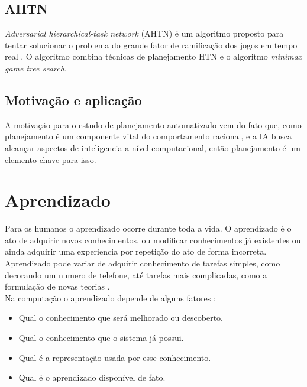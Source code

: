 
\subsection{AHTN} 

\textit{Adversarial hierarchical-task network} (AHTN) é um algoritmo proposto para tentar solucionar o problema do grande fator de ramificação dos jogos em tempo real \cite{ontanon2015adversarial}. O algoritmo combina técnicas de planejamento HTN e o algoritmo \textit{minimax game tree search}. \\

\subsection{Motivação e aplicação}
A motivação para o estudo de planejamento automatizado vem do fato que, como planejamento é um componente vital do comportamento racional, e a IA busca alcançar aspectos de inteligencia a nível computacional, então planejamento é um elemento chave para isso\cite{ghallab2004automated}.

\section{Aprendizado} 
Para os humanos o aprendizado ocorre durante toda a vida. O aprendizado é o ato de adquirir novos conhecimentos, ou modificar conhecimentos já existentes ou ainda adquirir uma experiencia por repetição do ato de forma incorreta. Aprendizado pode variar de adquirir conhecimento de tarefas simples, como decorando um numero de telefone, até tarefas mais complicadas, como a formulação de novas teorias \cite{intelligence2003modern}. \\
Na computação o aprendizado depende de alguns fatores \cite{intelligence2003modern}:
\begin{itemize}
	\item Qual o conhecimento que será melhorado ou descoberto.
	\item Qual o conhecimento que o sistema já possui.
	\item Qual é a representação usada por esse conhecimento.
	\item Qual é o aprendizado disponível de fato.
\end{itemize}


